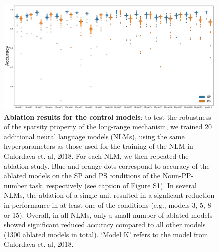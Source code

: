 \begin{landscape}
\begin{figure}
    \centering
    \includegraphics[width=\linewidth]{figures/SM/Ablation_results_all_models.png}
    \caption{\textbf{Ablation results for the control models}: to test the robustness of the sparsity property of the long-range mechanism, we trained 20 additional neural language models (NLMs), using the same hyperparameters as those used for the training of the NLM in Gulordava et. al, 2018. For each NLM, we then repeated the ablation study. Blue and orange dots correspond to accuracy of the ablated models on the SP and PS conditions of the Noun-PP-number task, respectively (see caption of Figure S1). In several NLMs, the ablation of a single unit resulted in a signficant reduction in performance in at least one of the conditions (e.g., models 3, 5, 8 or 15). Overall, in all NLMs, only a small number of ablated models showed significant reduced accuracy compared to all other models (1300 ablated models in total). `Model K' refers to the model from Gulordava et. al, 2018.}
    \label{fig:ablation_all_models}
\end{figure}
\end{landscape}

